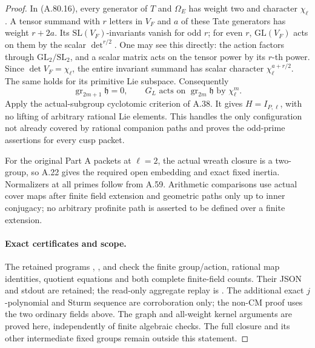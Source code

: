 \begin{proof}
In (A.80.16), every generator of \(T\) and \(\Omega_E\)
has weight two and character \(\chi_\ell\). A tensor
summand with \(r\) letters in \(V_F\) and \(a\) of
these Tate generators has weight \(r+2a\). Its
\(\mathrm{SL}(V_F)\)-invariants vanish for odd \(r\);
for even \(r\), \(\mathrm{GL}(V_F)\) acts on them
by the scalar \(\det^{r/2}\). One may see this directly:
the action factors through \(\mathrm{GL}_2/\mathrm{SL}_2\),
and a scalar matrix acts on the tensor power by its
\(r\)-th power. Since \(\det V_F=\chi_\ell\), the
entire invariant summand has scalar character
\(\chi_\ell^{a+r/2}\). The same holds for its primitive
Lie subspace. Consequently
\[
 \operatorname{gr}_{2m+1}\mathfrak h=0,\qquad
 G_L\text{ acts on }\operatorname{gr}_{2m}\mathfrak h
                           \text{ by }\chi_\ell^m.
                                                        \tag{A.80.18}
\]
Apply the actual-subgroup cyclotomic criterion of A.38.
It gives \(H=I_{P,\ell}\), with no lifting of arbitrary
rational Lie elements. This handles the only configuration
not already covered by rational companion paths and proves
the odd-prime assertions for every cusp packet.

For the original Part A packets at \(\ell=2\), the actual
wreath closure is a two-group, so A.22 gives the required
open embedding and exact fixed inertia. Normalizers at all
primes follow from A.59. Arithmetic comparisons use actual
cover maps after finite field extension and geometric paths
only up to inner conjugacy; no arbitrary profinite path is
asserted to be defined over a finite extension.

\paragraph{Exact certificates and scope.}
The retained programs
,
, and
check the finite group/action, rational map identities,
quotient equations and both complete finite-field counts.
Their JSON and stdout are retained; the read-only aggregate replay is
. The additional exact
\(j\)-polynomial and Sturm sequence are corroboration only;
the non-CM proof uses the two ordinary fields above.
The graph and all-weight kernel arguments are proved here,
independently of finite algebraic checks. The full closure
and its other intermediate fixed groups remain outside
this statement.
\end{proof}
